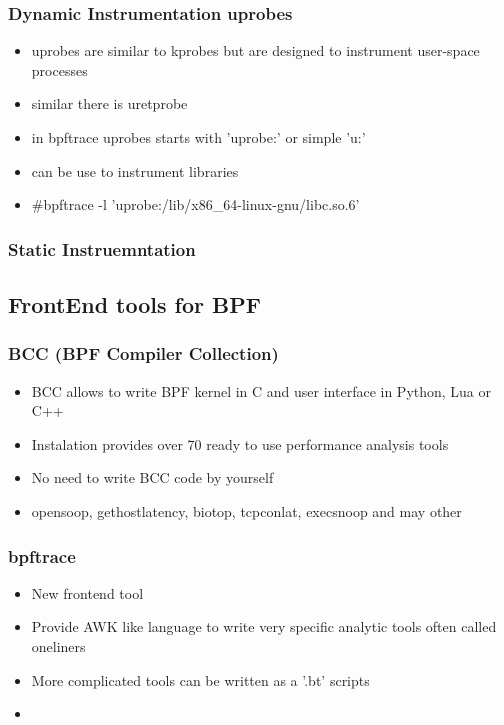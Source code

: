 \documentclass{beamer}
\begin{document}
\begin{frame}
  \frametitle{Dynamic Instrumentation uprobes}
  \begin{itemize}
    \item<1-> uprobes are similar to kprobes but are designed to instrument user-space processes
		\item<2-> similar there is uretprobe
		\item<3-> in bpftrace uprobes starts with 'uprobe:' or simple 'u:'
		\item<4-> can be use to instrument libraries
    \item<5-> #bpftrace -l 'uprobe:/lib/x86\_64-linux-gnu/libc.so.6'
	\end{itemize}	
\end{frame}

\begin{frame}
  \frametitle{Static Instruemntation}
\end{frame}

\subsection{FrontEnd tools for BPF}
\begin{frame}
  \frametitle{BCC (BPF Compiler Collection)}
  \begin{itemize}
    \item<1-> BCC allows to write BPF kernel in C and user interface in Python, Lua or C++
    \item<2-> Instalation provides over 70 ready to use performance analysis tools
    \item<3-> No need to write BCC code by yourself
    \item<4-> opensoop, gethostlatency, biotop, tcpconlat, execsnoop and may other
  \end{itemize}
\end{frame}

\begin{frame}
  \frametitle{bpftrace}
  \begin{itemize}
    \item<1-> New frontend tool
    \item<2-> Provide AWK like language to write very specific analytic tools often called oneliners
    \item<3-> More complicated tools can be written as a '.bt' scripts
    \item<4-> 
  \end{itemize}
\end{frame}
\end{document}

